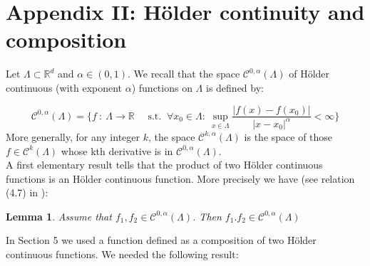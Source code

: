 \documentclass{elsart}
\newtheorem{lemm}[defi]{Lemma}
\begin{document}
\section*{Appendix II: H\"older continuity and composition}

Let $\Lambda \subset \mathbb R^d$ and $\alpha \in (0,1)$. We recall that the 
space $\mathcal{C}^{0,\alpha}(\Lambda)$ of H\"older continuous (with exponent $\alpha$) functions on $\Lambda$ is defined by:

$$\mathcal{C}^{0,\alpha}(\Lambda) = \big\{ f \ : \ \Lambda \to \mathbb R 
\quad \text{ s.t. } \ \forall x_0 \in \Lambda: \ 
\sup\limits_{x \in \Lambda} \frac{|f(x)-f(x_0)|}{|x-x_0|^{\alpha}} < \infty 
\big\}$$
More generally, for any integer $k$, the space 
$\mathcal{C}^{k,\alpha}(\Lambda)$ 
is the space of those $f \in \mathcal{C}^k(\Lambda)$ whose kth derivative is in 
$\mathcal{C}^{0,\alpha}(\Lambda)$.\\ 

A first elementary result tells that the product of two H\"older continuous functions is an H\"older continuous function. More precisely we have 
(see relation (4.7) in \cite{gil}): 
\begin{lemm} \label{lem1ap2}
Assume that $f_1, f_2 \in \mathcal{C}^{0,\alpha}(\Lambda)$. Then 
$f_1.f_2 \in \mathcal{C}^{0,\alpha}(\Lambda)$
\end{lemm} 

In Section 5 we used a function defined as a composition of two 
H\"older continuous functions. We needed the following result: 
\end{document}
